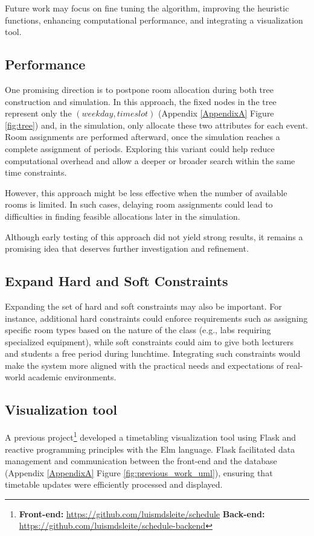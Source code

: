 Future work may focus on fine tuning the algorithm, improving the heuristic functions, enhancing computational performance, and integrating a visualization tool.

\subsection{Performance}

One promising direction is to postpone room allocation during both tree construction and simulation. In this approach, the fixed nodes in the tree represent only the \((weekday, timeslot)\) (Appendix \ref{AppendixA} Figure \ref{fig:tree}) and, in the simulation, only allocate these two attributes for each event. Room assignments are performed afterward, once the simulation reaches a complete assignment of periods. Exploring this variant could help reduce computational overhead and allow a deeper or broader search within the same time constraints.

However, this approach might be less effective when the number of available rooms is limited. In such cases, delaying room assignments could lead to difficulties in finding feasible allocations later in the simulation.

Although early testing of this approach did not yield strong results, it remains a promising idea that deserves further investigation and refinement.

\subsection{Expand Hard and Soft Constraints}

Expanding the set of hard and soft constraints may also be important. For instance, additional hard constraints could enforce requirements such as assigning specific room types based on the nature of the class (e.g., labs requiring specialized equipment), while soft constraints could aim to give both lecturers and students a free period during lunchtime. Integrating such constraints would make the system more aligned with the practical needs and expectations of real-world academic environments.

\subsection{Visualization tool}

A previous project\footnote{\textbf{Front-end:} \url{https://github.com/luismdsleite/schedule} \textbf{Back-end:} \url{https://github.com/luismdsleite/schedule-backend}} developed a timetabling visualization tool using Flask and reactive programming principles with the Elm language. Flask facilitated data management and communication between the front-end and the database (Appendix \ref{AppendixA} Figure \ref{fig:previous_work_uml}), ensuring that timetable updates were efficiently processed and displayed. 

